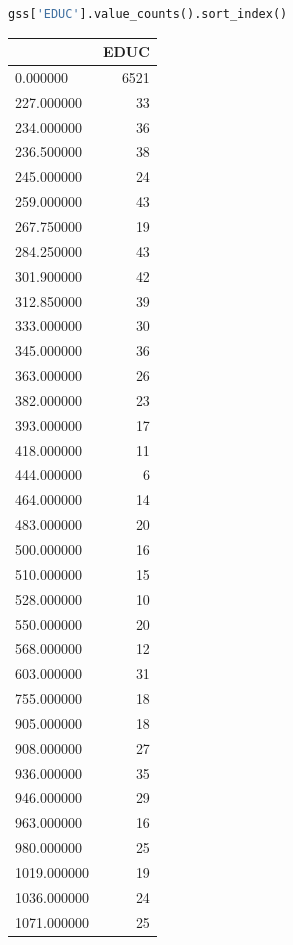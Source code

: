 \begin{lstlisting}[language=Python,style=source]
gss['EDUC'].value_counts().sort_index()
\end{lstlisting}

\begin{tabular}{lr}
\toprule
{} &  EDUC \\
\midrule
0.000000      &  6521 \\
227.000000    &    33 \\
234.000000    &    36 \\
236.500000    &    38 \\
245.000000    &    24 \\
259.000000    &    43 \\
267.750000    &    19 \\
284.250000    &    43 \\
301.900000    &    42 \\
312.850000    &    39 \\
333.000000    &    30 \\
345.000000    &    36 \\
363.000000    &    26 \\
382.000000    &    23 \\
393.000000    &    17 \\
418.000000    &    11 \\
444.000000    &     6 \\
464.000000    &    14 \\
483.000000    &    20 \\
500.000000    &    16 \\
510.000000    &    15 \\
528.000000    &    10 \\
550.000000    &    20 \\
568.000000    &    12 \\
603.000000    &    31 \\
755.000000    &    18 \\
905.000000    &    18 \\
908.000000    &    27 \\
936.000000    &    35 \\
946.000000    &    29 \\
963.000000    &    16 \\
980.000000    &    25 \\
1019.000000   &    19 \\
1036.000000   &    24 \\
1071.000000   &    25 \\

\end{tabular}
